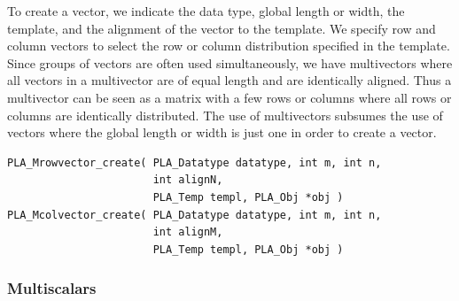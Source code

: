 To create a vector, we indicate the data type, global length or width,
the template, and the alignment of the vector to the template.
We specify row and column vectors to select the row or column distribution specified
in the template.  Since groups of vectors are often used simultaneously, we have
multivectors where all vectors in a multivector are of equal length and are identically
aligned.  Thus a multivector can be seen as a matrix with a few rows or columns where all
rows or columns are identically distributed.  The use of multivectors subsumes the use
of vectors where the global length or width is just one in order to create a vector.
\begin{FlaSpec}
\begin{verbatim}
PLA_Mrowvector_create( PLA_Datatype datatype, int m, int n,
                       int alignN, 
                       PLA_Temp templ, PLA_Obj *obj )
PLA_Mcolvector_create( PLA_Datatype datatype, int m, int n,
                       int alignM, 
                       PLA_Temp templ, PLA_Obj *obj )
\end{verbatim}
\end{FlaSpec}

\subsubsection{Multiscalars}

